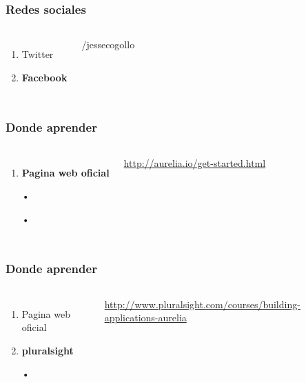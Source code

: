 \documentclass{beamer}
\begin{document}
\begin{frame}
\frametitle{Redes sociales}
\begin{columns}[c] %

\begin{enumerate}
\item Twitter
\item \textbf{Facebook}
\end{enumerate}

{\color{blue}/jessecogollo}
\end{columns}
\end{frame}
\begin{frame}
\frametitle{Donde aprender}
\begin{columns}[c] %
\begin{enumerate}
\item \textbf{Pagina web oficial}
\item[•]
\item[•]
\end{enumerate}

{\color{blue}\url{http://aurelia.io/get-started.html}}
\end{columns}
\end{frame}
\begin{frame}
\frametitle{Donde aprender}
\begin{columns}[c] %
\begin{enumerate}
\item Pagina web oficial
\item \textbf{pluralsight}
\item[•]
\end{enumerate}

{\color{blue}\url{http://www.pluralsight.com/courses/building-applications-aurelia}}
\end{columns}
\end{frame}
\end{document}
